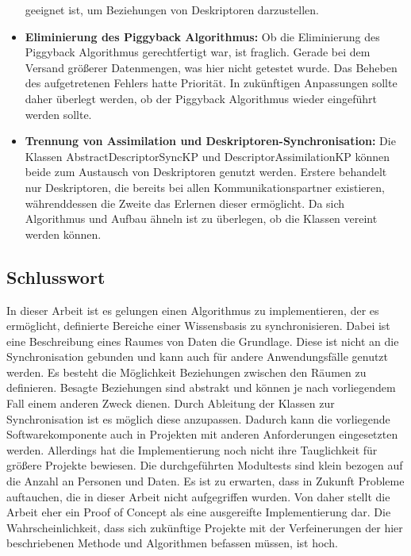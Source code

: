 \documentclass[a4paper]{article}
\begin{document}
\begin{itemize}
		geeignet ist, um Beziehungen von Deskriptoren darzustellen.
		\item \textbf{Eliminierung des Piggyback Algorithmus:} Ob die 
		Eliminierung des Piggyback Algorithmus gerechtfertigt war, ist fraglich.
		Gerade bei dem Versand größerer Datenmengen, was hier nicht getestet wurde.
		Das Beheben des aufgetretenen Fehlers hatte Priorität. In zukünftigen
		Anpassungen sollte daher überlegt werden, ob der Piggyback Algorithmus
		wieder eingeführt werden sollte.
		\newpage
		\item \textbf{Trennung von Assimilation und Deskriptoren-Synchronisation:}
		Die Klassen AbstractDescriptorSyncKP und DescriptorAssimilationKP 
		können beide zum Austausch von Deskriptoren genutzt werden. 
		Erstere behandelt nur Deskriptoren, die bereits bei allen
		Kommunikationspartner existieren, währenddessen die Zweite das Erlernen
		dieser ermöglicht. Da sich Algorithmus und Aufbau ähneln ist zu überlegen,
		ob die Klassen vereint werden können.	
	\end{itemize} 
	
	\subsection{Schlusswort}
	
	In dieser Arbeit ist es gelungen einen Algorithmus zu implementieren, der
	es ermöglicht, definierte Bereiche einer Wissensbasis zu synchronisieren.
	Dabei ist eine Beschreibung eines Raumes von Daten die Grundlage. Diese
	ist nicht an die Synchronisation gebunden und kann auch
	für andere Anwendungsfälle genutzt werden. Es besteht die Möglichkeit Beziehungen
	zwischen den Räumen zu definieren. Besagte Beziehungen sind abstrakt und können
	je nach	vorliegendem Fall einem anderen Zweck dienen. Durch Ableitung der 
	Klassen zur Synchronisation ist	es möglich diese anzupassen. Dadurch kann 
	die vorliegende Softwarekomponente auch in Projekten mit
	anderen Anforderungen eingesetzten werden. Allerdings hat die Implementierung
	noch nicht ihre Tauglichkeit für größere Projekte bewiesen. Die 
	durchgeführten Modultests sind klein bezogen auf die Anzahl an Personen
	und Daten. Es ist zu erwarten, dass in Zukunft Probleme auftauchen,
	die in dieser Arbeit nicht aufgegriffen wurden. Von daher stellt die Arbeit
	eher ein Proof of Concept als eine ausgereifte Implementierung dar. 
	Die Wahrscheinlichkeit, dass sich zukünftige Projekte mit der Verfeinerungen 
	der hier beschriebenen Methode und Algorithmen befassen müssen, ist hoch. 
	
\end{document}

